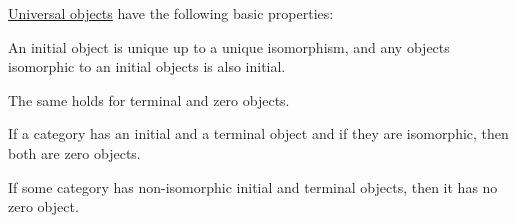 \begin{proposition}\label{thm:def:universal_objects}
  \hyperref[def:universal_objects]{Universal objects} have the following basic properties:
  \begin{thmenum}
     An initial object is unique up to a unique isomorphism, and any objects isomorphic to an initial objects is also initial.

    The same holds for terminal and zero objects.

     If a category has an initial and a terminal object and if they are isomorphic, then both are zero objects.

     If some category has non-isomorphic initial and terminal objects, then it has no zero object.
  \end{thmenum}
\end{proposition}
